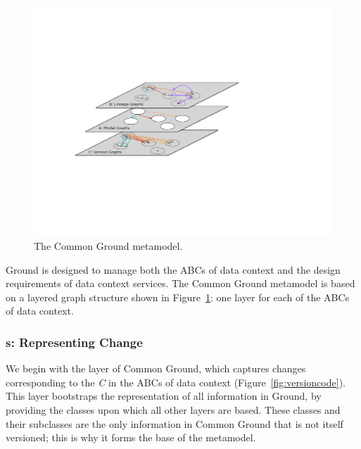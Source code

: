 \documentclass{sig-alternate}
\begin{document}
\begin{figure}[th]
\centering
\includegraphics[width=\linewidth]{layers.pdf}
\caption{The Common Ground metamodel.} 
\label{fig:layers}
\end{figure}

Ground is designed to manage both the ABCs of data context and the design requirements of data context services.
The Common Ground metamodel is based on a layered graph structure shown in Figure~\ref{fig:layers}: one layer for each of the ABCs of data context.

\subsubsection{{\VersionGraph}s: Representing Change}

We begin with the \versiongraph layer of Common Ground, which captures changes corresponding to the \emph{C} in the ABCs of data context (Figure~\ref{fig:versioncode}).
This layer bootstraps the representation of all information in Ground, by providing the classes upon which all other layers are based. These classes and their subclasses are the only information in Common Ground that is not itself versioned; this is why it forms the base of the metamodel.
\end{document}
